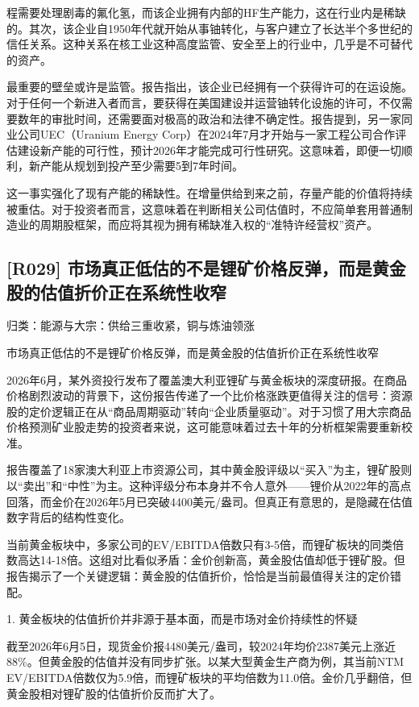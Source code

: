 \documentclass[11pt]{ctexart}
\begin{document}
程需要处理剧毒的氟化氢，而该企业拥有内部的HF生产能力，这在行业内是稀缺的。其次，该企业自1950年代就开始从事铀转化，与客户建立了长达半个多世纪的信任关系。这种关系在核工业这种高度监管、安全至上的行业中，几乎是不可替代的资产。

最重要的壁垒或许是监管。报告指出，该企业已经拥有一个获得许可的在运设施。对于任何一个新进入者而言，要获得在美国建设并运营铀转化设施的许可，不仅需要数年的审批时间，还需要面对极高的政治和法律不确定性。报告提到，另一家同业公司UEC（Uranium Energy Corp）在2024年7月才开始与一家工程公司合作评估建设新产能的可行性，预计2026年才能完成可行性研究。这意味着，即便一切顺利，新产能从规划到投产至少需要5到7年时间。

这一事实强化了现有产能的稀缺性。在增量供给到来之前，存量产能的价值将持续被重估。对于投资者而言，这意味着在判断相关公司估值时，不应简单套用普通制造业的周期股框架，而应将其视为拥有稀缺准入权的“准特许经营权”资产。

\subsection{[R029] 市场真正低估的不是锂矿价格反弹，而是黄金股的估值折价正在系统性收窄}
{\small\color{refgray}归类：能源与大宗：供给三重收紧，铜与炼油领涨}

市场真正低估的不是锂矿价格反弹，而是黄金股的估值折价正在系统性收窄

2026年6月，某外资投行发布了覆盖澳大利亚锂矿与黄金板块的深度研报。在商品价格剧烈波动的背景下，这份报告传递了一个比价格涨跌更值得关注的信号：资源股的定价逻辑正在从“商品周期驱动”转向“企业质量驱动”。对于习惯了用大宗商品价格预测矿业股走势的投资者来说，这可能意味着过去十年的分析框架需要重新校准。

报告覆盖了18家澳大利亚上市资源公司，其中黄金股评级以“买入”为主，锂矿股则以“卖出”和“中性”为主。这种评级分布本身并不令人意外——锂价从2022年的高点回落，而金价在2026年5月已突破4400美元/盎司。但真正有意思的，是隐藏在估值数字背后的结构性变化。

当前黄金板块中，多家公司的EV/EBITDA倍数只有3-5倍，而锂矿板块的同类倍数高达14-18倍。这组对比看似矛盾：金价创新高，黄金股估值却低于锂矿股。但报告揭示了一个关键逻辑：黄金股的估值折价，恰恰是当前最值得关注的定价错配。

1. 黄金板块的估值折价并非源于基本面，而是市场对金价持续性的怀疑

截至2026年6月5日，现货金价报4480美元/盎司，较2024年均价2387美元上涨近88\%。但黄金股的估值并没有同步扩张。以某大型黄金生产商为例，其当前NTM EV/EBITDA倍数仅为5.9倍，而锂矿板块的平均倍数为11.0倍。金价几乎翻倍，但黄金股相对锂矿股的估值折价反而扩大了。
\end{document}
